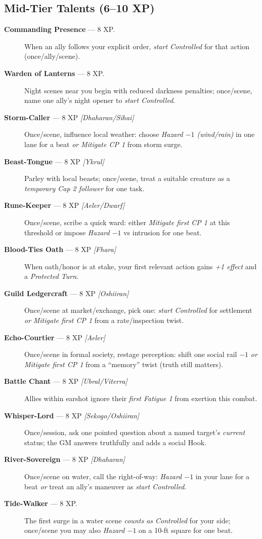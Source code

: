 \documentclass[11pt]{article}
\begin{document}
\subsection*{Mid-Tier Talents (6–10 XP)}
\begin{description}
  \item[\textbf{Commanding Presence} — 8 XP.] When an ally follows your explicit order, \emph{start Controlled} for that action (once/ally/scene).
  \item[\textbf{Warden of Lanterns} — 8 XP.] Night scenes near you begin with reduced darkness penalties; once/scene, name one ally’s night opener to \emph{start Controlled}.
  \item[\textbf{Storm-Caller} — 8 XP \emph{[Dhaharan/Sihai]}] Once/scene, influence local weather: choose \emph{Hazard $-1$ (wind/rain)} in one lane for a beat \emph{or} \emph{Mitigate CP 1} from storm surge.
  \item[\textbf{Beast-Tongue} — 8 XP \emph{[Ykrul]}] Parley with local beasts; once/scene, treat a suitable creature as a \emph{temporary Cap 2 follower} for one task.
  \item[\textbf{Rune-Keeper} — 8 XP \emph{[Aeler/Dwarf]}] Once/scene, scribe a quick ward: either \emph{Mitigate first CP 1} at this threshold or impose \emph{Hazard $-1$} vs intrusion for one beat.
  \item[\textbf{Blood-Ties Oath} — 8 XP \emph{[Fhara]}] When oath/honor is at stake, your first relevant action gains \emph{+1 effect} and a \emph{Protected Turn}.
  \item[\textbf{Guild Ledgercraft} — 8 XP \emph{[Oshiiran]}] Once/scene at market/exchange, pick one: \emph{start Controlled} for settlement \emph{or} \emph{Mitigate first CP 1} from a rate/inspection twist.
  \item[\textbf{Echo-Courtier} — 8 XP \emph{[Aeler]}] Once/scene in formal society, restage perception: shift one social rail \emph{$-1$} \emph{or} \emph{Mitigate first CP 1} from a “memory” twist (truth still matters).
  \item[\textbf{Battle Chant} — 8 XP \emph{[Ubral/Viterra]}] Allies within earshot ignore their \emph{first Fatigue 1} from exertion this combat.
  \item[\textbf{Whisper-Lord} — 8 XP \emph{[Sekogo/Oshiiran]}] Once/session, ask one pointed question about a named target’s \emph{current} status; the GM answers truthfully and adds a social Hook.
  \item[\textbf{River-Sovereign} — 8 XP \emph{[Dhaharan]}] Once/scene on water, call the right-of-way: \emph{Hazard $-1$} in your lane for a beat \emph{or} treat an ally’s maneuver as \emph{start Controlled}.
  \item[\textbf{Tide-Walker} — 8 XP.] The first surge in a water scene \emph{counts as Controlled} for your side; once/scene you may also \emph{Hazard $-1$} on a 10-ft square for one beat.
\end{description}
\end{document}
